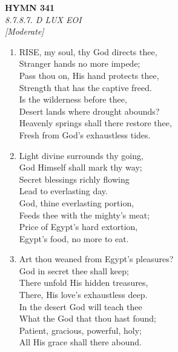 \newpage
\begin{center}
    {\Large \textbf{HYMN 341}}
    \\
    \textit{8.7.8.7. D LUX EOI}
    \\
    \textit{\small [Moderate]}
\end{center}
\vspace{1em}

\begin{enumerate}
    \item RISE, my soul, thy God directs thee, \\
        Stranger hands no more impede; \\
        Pass thou on, His hand protects thee, \\
        Strength that has the captive freed. \\
        Is the wilderness before thee, \\
        Desert lands where drought abounds? \\
        Heavenly springs shall there restore thee, \\
        Fresh from God's exhaustless tides.

    \item Light divine surrounds thy going, \\
        God Himself shall mark thy way; \\
        Secret blessings richly flowing \\
        Lead to everlasting day. \\
        God, thine everlasting portion, \\
        Feeds thee with the mighty's meat; \\
        Price of Egypt's hard extortion, \\
        Egypt's food, no more to eat.

    \item Art thou weaned from Egypt's pleasures? \\
        God in secret thee shall keep; \\
        There unfold His hidden treasures, \\
        There, His love's exhaustless deep. \\
        In the desert God will teach thee \\
        What the God that thou hast found; \\
        Patient, gracious, powerful, holy; \\
        All His grace shall there abound.


\end{enumerate}
